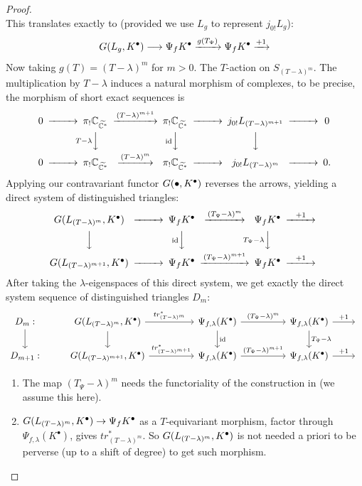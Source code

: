 \begin{proof}
\[    \]
    This translates exactly to (provided we use $L_g$ to represent $j_{0!}L_g$):
    \[
        G(L_g, {K^\bullet}) \longrightarrow \Psi_f K^\bullet \xrightarrow{g(T_\Psi)} \Psi_f K^\bullet \xrightarrow{+1}
    \]
    Now taking $g(T) = (T-\lambda)^m$ for $m > 0$. The $T$-action on $S_{(T-\lambda)^m}$. The multiplication by $T-\lambda$ induces a natural morphism of complexes, to be precise, the morphism of short exact sequences is
    \[
        \begin{CD}
            0@>>>\pi_!\C_{\widetilde{\C^*}}@>(T-\lambda)^{m+1}>>\pi_!\C_{\widetilde{\C^*}} @>>> j_{0!} L_{(T-\lambda)^{m+1}} @>>>0\\
            @.@V{T-\lambda}VV @V{\text{id}}VV @VVV\\
            0@>>>\pi_!\C_{\widetilde{\C^*}}@>(T-\lambda)^{m}>>\pi_!\C_{\widetilde{\C^*}} @>>> j_{0!} L_{(T-\lambda)^m} @>>>0 .
        \end{CD}
    \]
    Applying our contravariant functor $G(\bullet, {K^\bullet})$ reverses the arrows, yielding a direct system of distinguished triangles:
    \[
        \begin{CD}
            \biG{L_{(T-\lambda)^m}} @>>> \Psi_f K^\bullet @>(T_\Psi-\lambda)^m>> \Psi_f K^\bullet @>{+1}>> \\
            @VVV @V{\text{id}}VV @V{T_\Psi-\lambda}VV \\
            \biG{L_{(T-\lambda)^{m+1}}} @>>> \Psi_f K^\bullet @>(T_\Psi-\lambda)^{m+1}>> \Psi_f K^\bullet @>{+1}>>
        \end{CD}
    \]
    After taking the $\lambda$-eigenspaces of this direct system, we get exactly the direct system sequence of distinguished triangles $D_m$:
    \[
        \begin{tikzcd}
            D_m: \arrow[d] & \biG{L_{(T-\lambda)^m}} \arrow[rr, "{tr_{(T-\lambda)^m}^*}"] \arrow[d] && \Psi_{f,\lambda}(K^\bullet) \arrow[rr, "{(T_\Psi-\lambda)^m}"] \arrow[d, "\text{id}"] && \Psi_{f,\lambda}(K^\bullet) \arrow[r, "+1"] \arrow[d, "T_\Psi-\lambda"] & {} \\
            D_{m+1}:       & \biG{L_{(T-\lambda)^{m+1}}} \arrow[rr, "{tr_{(T-\lambda)^{m+1}}^*}"] && \Psi_{f,\lambda}(K^\bullet) \arrow[rr, "{(T_\Psi-\lambda)^{m+1}}"] && \Psi_{f,\lambda}(K^\bullet) \arrow[r, "+1"] & {}
        \end{tikzcd}
    \]
    \begin{enumerate}
        \item The map $(T_\Psi-\lambda)^m$ needs the functoriality of the construction in \cite[Lem.~3.2]{Wu2017NearbyVanishingCycles} (we assume this here).
        \item $G(L_{(T-\lambda)^m}, {K^\bullet}) \to \Psi_f K^\bullet$ as a $T$-equivariant morphism, factor through $\Psi_{f,\lambda}(K^\bullet)$, gives  $tr_{(T-\lambda)^m}^*$. So $G(L_{(T-\lambda)^m}, {K^\bullet})$ is not needed a priori to be perverse (up to a shift of degree) to get such morphism.
    \end{enumerate}


\end{proof}
